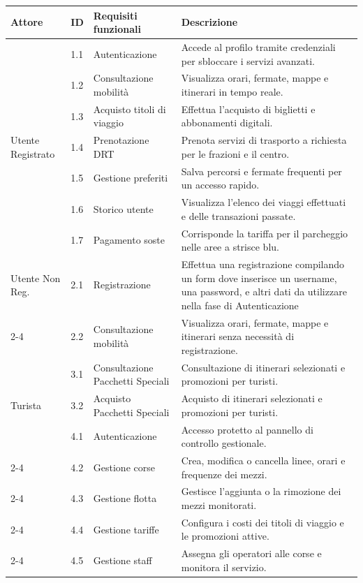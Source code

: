 \begin{table}[H]
\centering
\tiny
\renewcommand{\arraystretch}{1.4} 
\begin{tabularx}{\textwidth}{|l|l|X|X|}
\hline
\textbf{Attore} & \textbf{ID} & \textbf{Requisiti funzionali} & \textbf{Descrizione} \\ \hline

\multirow{7}{*}{Utente Registrato} & 1.1 & Autenticazione & Accede al profilo tramite credenziali per sbloccare i servizi avanzati. \\ \cline{2-4} 
 & 1.2 & Consultazione mobilità & Visualizza orari, fermate, mappe e itinerari in tempo reale. \\ \cline{2-4} 
 & 1.3 & Acquisto titoli di viaggio & Effettua l'acquisto di biglietti e abbonamenti digitali. \\ \cline{2-4} 
 & 1.4 & Prenotazione DRT & Prenota servizi di trasporto a richiesta per le frazioni e il centro. \\ \cline{2-4} 
 & 1.5 & Gestione preferiti & Salva percorsi e fermate frequenti per un accesso rapido. \\ \cline{2-4} 
 & 1.6 & Storico utente & Visualizza l'elenco dei viaggi effettuati e delle transazioni passate. \\ \cline{2-4} 
 & 1.7 & Pagamento soste & Corrisponde la tariffa per il parcheggio nelle aree a strisce blu. \\ \hline

\multirow{1}{*}{Utente Non Reg.} & 2.1 & Registrazione & Effettua una registrazione compilando un form dove inserisce un username, una password, e altri dati da utilizzare nella fase di Autenticazione \\ \cline{2-4} 
& 2.2 & Consultazione mobilità & Visualizza orari, fermate, mappe e itinerari senza necessità di registrazione. \\ \hline

\multirow{3}{*}{Turista} & 3.1 & Consultazione Pacchetti Speciali & Consultazione di itinerari selezionati e promozioni per turisti.\\ \cline{2-4} 
 & 3.2 & Acquisto Pacchetti Speciali & Acquisto di itinerari selezionati e promozioni per turisti.\\ \hline

\multirow{5}{*}{Admin Ente} & 4.1 & Autenticazione & Accesso protetto al pannello di controllo gestionale. \\ \cline{2-4} 
 & 4.2 & Gestione corse & Crea, modifica o cancella linee, orari e frequenze dei mezzi. \\ \cline{2-4} 
 & 4.3 & Gestione flotta & Gestisce l'aggiunta o la rimozione dei mezzi monitorati. \\ \cline{2-4} 
 & 4.4 & Gestione tariffe & Configura i costi dei titoli di viaggio e le promozioni attive. \\ \cline{2-4} 
 & 4.5 & Gestione staff & Assegna gli operatori alle corse e monitora il servizio. \\ \hline


\end{tabularx}
\end{table}
